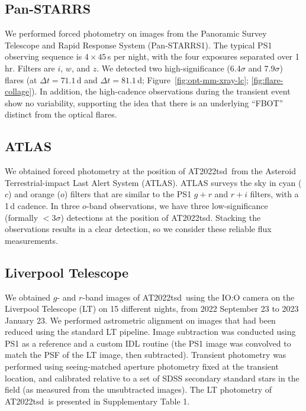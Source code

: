 \documentclass{nature_plusfigure}
\newcommand{\at}{AT2022tsd}
\begin{document}
\begin{methods}
\subsection{Pan-STARRS}
\label{sec:panstarrs}

We performed forced photometry on images from the Panoramic Survey Telescope and Rapid Response System (Pan-STARRS1\cite{Tonry2012,Chambers2016,Flewelling2020}).
The typical PS1 observing sequence is $4\times45$\,s per night, with the
four exposures separated over 1\,hr. Filters are $i$, $w$, and $z$\cite{Tonry2012}.
We detected two high-significance (6.4$\sigma$ and 7.9$\sigma$) flares (at $\Delta t=71.1$\,d and $\Delta t=81.1\,$d; Figure~\ref{fig:opt-mm-xray-lc}; \ref{fig:flare-collage}).
In addition, the high-cadence observations during the transient event show no variability, supporting the idea that there is an underlying ``FBOT'' distinct from the optical flares.

\subsection{ATLAS}
\label{sec:atlas}

We obtained forced photometry at the position of \at\ from the Asteroid Terrestrial-impact Last Alert System (ATLAS\cite{Tonry2018,Smith2020,Shingles2021}).
ATLAS surveys the sky in cyan ($c$) and orange ($o$) filters that are similar to the PS1 $g+r$ and $r+i$ filters,
with a 1\,d cadence.
In three $o$-band observations, we have three low-significance (formally $<3\sigma$) detections at the position of \at.
Stacking the observations results in a clear detection, so we consider these reliable flux measurements.

\subsection{Liverpool Telescope}
\label{Methods: LT}

We obtained $g$- and $r$-band images of \at\ using the IO:O camera on the Liverpool Telescope\cite{Steele2004} (LT) on 15 different nights, from 2022 September 23 to 2023 January 23. We performed astrometric alignment on images that had been reduced using the standard LT pipeline.  Image subtraction was conducted using PS1 as a reference and a custom IDL routine (the PS1 image was convolved to match the PSF of the LT image, then subtracted).  Transient photometry was performed using seeing-matched aperture photometry fixed at the transient location, and calibrated relative to a set of SDSS secondary standard stars in the field (as measured from the unsubtracted images). The LT photometry of \at\ is presented in Supplementary Table 1.


\end{methods}
\end{document}

